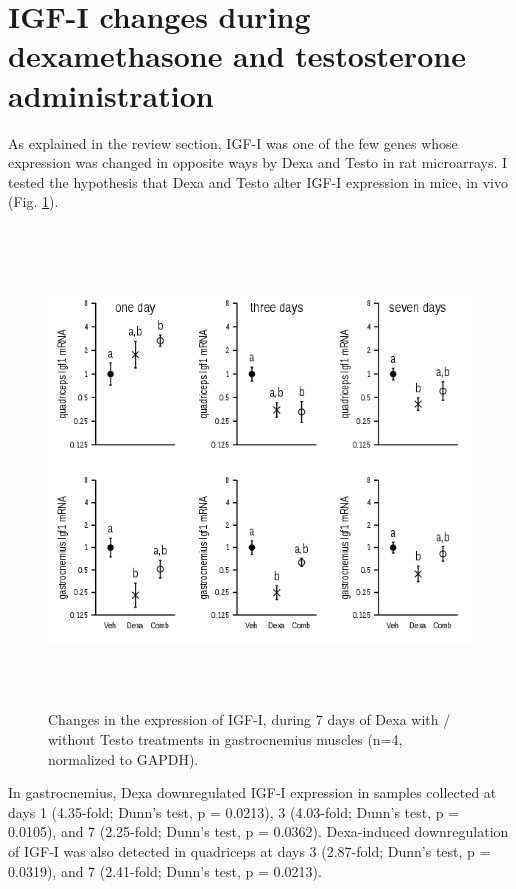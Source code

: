 \documentclass[12pt,english]{report}\usepackage[]{graphicx}\usepackage[]{color}
\newenvironment{knitrout}{}{} %
\begin{document}
\section{IGF-I changes during dexamethasone and testosterone administration}

As explained in the review section, IGF-I was one of the few genes
whose expression was changed in opposite ways by Dexa and Testo in
rat microarrays. I tested the hypothesis that Dexa and Testo alter
IGF-I expression in mice, in vivo (Fig. \ref{fig:Igf1-expression}).

\begin{figure}
\begin{knitrout}
\color{fgcolor}
\includegraphics[width=6in,height=5in]{figure/Igf-1} 

\end{knitrout}

\protect\caption[Changes in the expression of IGF-I during Dexa with / without Testo
treatments.]{Changes in the expression of IGF-I, during 7 days of Dexa with /
without Testo treatments in gastrocnemius muscles (n=4, normalized
to GAPDH).\label{fig:Igf1-expression}}
\end{figure}
 In gastrocnemius, Dexa downregulated IGF-I expression in samples
collected at days 1 (4.35-fold;
Dunn's test, p = 0.0213),
3 (4.03-fold;
Dunn's test, p = 0.0105),
and 7 (2.25-fold;
Dunn's test, p = 0.0362).
Dexa-induced downregulation of IGF-I was also detected in quadriceps
at days 3 (2.87-fold;
Dunn's test, p = 0.0319),
and 7 (2.41-fold;
Dunn's test, p = 0.0213).
\end{document}
